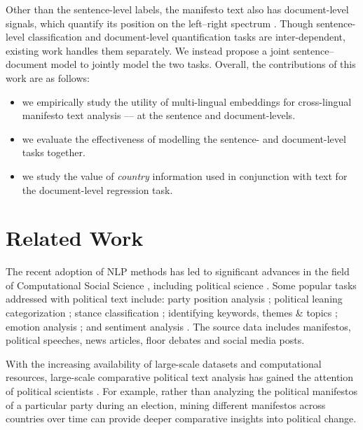 \documentclass[11pt,a4paper]{article}
\begin{document}

Other than the sentence-level labels, the manifesto text also has document-level signals,
which quantify its position on the left--right spectrum \cite{slapin2008scaling}. Though sentence-level classification and document-level quantification tasks are inter-dependent, existing work handles them separately.  We instead propose a joint sentence--document model to jointly model the two tasks. Overall, the contributions of this work are as follows:
\begin{itemize}
\item we empirically study the utility of multi-lingual embeddings for cross-lingual manifesto text analysis --- at the sentence and document-levels.

\item we evaluate the effectiveness of modelling the sentence- and document-level tasks together.

\item we study the value of \textit{country} information used in conjunction with text for the document-level regression task.
\end{itemize}


\section{Related Work}

The recent adoption of NLP methods has led to significant advances in the field of Computational Social Science \cite{lazer2009life}, including political science \cite{grimmer2013text}. Some popular tasks addressed with political text include: party position analysis \cite{biessmann2016automating};  political leaning categorization \cite{akoglu2014quantifying, zhou2011classifying}; stance classification \cite{sridhar2014collective}; identifying keywords, themes \& topics \cite{karan2016analysis, nallapati2004extraction, ding2011keyphrase}; emotion analysis \cite{rheault2016expressions}; and sentiment analysis \cite{bakliwal2013sentiment}. The source data includes manifestos, political speeches, news articles, floor debates and social media posts. 

With the increasing availability of large-scale datasets and computational resources, large-scale comparative political text analysis has gained the attention of political scientists \cite{lucas2015computer}. For example, rather than analyzing the political manifestos of a particular party during an election, mining different manifestos across countries over time can provide deeper comparative insights into political change.
\end{document}
